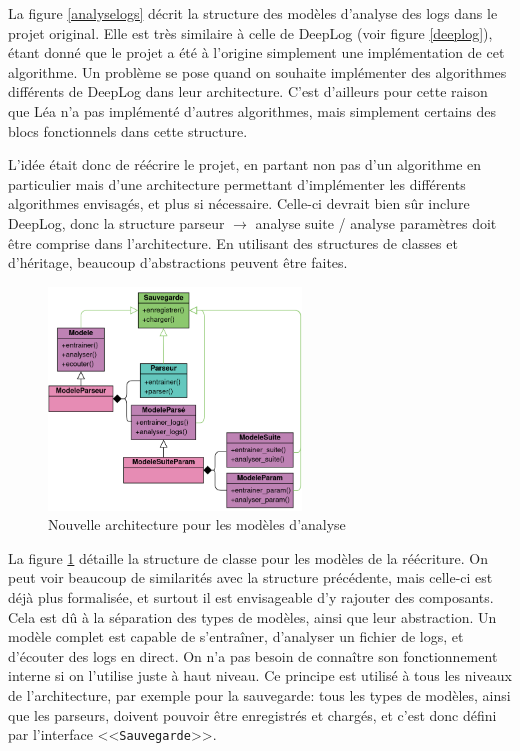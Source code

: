 \documentclass[openany, 11pt]{memoir}
\begin{document}
La figure \ref{analyselogs} décrit la structure des modèles d'analyse des \glspl{log} dans le projet original. Elle est très similaire à celle de DeepLog (voir figure \ref{deeplog}), étant donné que le projet a été à l'origine simplement une implémentation de cet algorithme. Un problème se pose quand on souhaite implémenter des algorithmes différents de DeepLog dans leur architecture. C'est d'ailleurs pour cette raison que Léa n'a pas implémenté d'autres algorithmes, mais simplement certains des blocs fonctionnels dans cette structure.

L'idée était donc de réécrire le projet, en partant non pas d'un algorithme en particulier mais d'une architecture permettant d'implémenter les différents algorithmes envisagés, et plus si nécessaire. Celle-ci devrait bien sûr inclure DeepLog, donc la structure parseur $\rightarrow$ analyse suite / analyse paramètres doit être comprise dans l'architecture. En utilisant des structures de classes et d'héritage, beaucoup d'abstractions peuvent être faites.

\begin{figure}[ht]
	\centering
	\includegraphics[width=0.6\textwidth]{images/archireecriture.png}
	\caption{Nouvelle architecture pour les modèles d'analyse}
	\label{archireecriture}
\end{figure}

La figure \ref{archireecriture} détaille la structure de classe pour les modèles de la réécriture. On peut voir beaucoup de similarités avec la structure précédente, mais celle-ci est déjà plus formalisée, et surtout il est envisageable d'y rajouter des composants. Cela est dû à la séparation des types de modèles, ainsi que leur abstraction. Un modèle complet est capable de s'entraîner, d'analyser un fichier de \glspl{log}, et d'écouter des logs en direct. On n'a pas besoin de connaître son fonctionnement interne si on l'utilise juste à haut niveau. Ce principe est utilisé à tous les niveaux de l'architecture, par exemple pour la sauvegarde: tous les types de modèles, ainsi que les parseurs, doivent pouvoir être enregistrés et chargés, et c'est donc défini par l'interface <<\texttt{Sauvegarde}>>.
\end{document}
